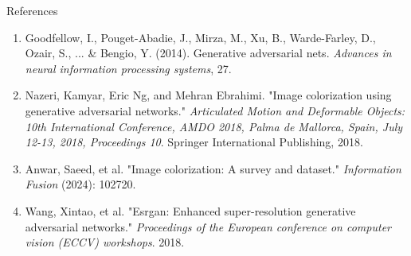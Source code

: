 \documentclass[aspectratio=169]{beamer}
\theoremstyle{definition}
\begin{document}
\begin{frame}{References}
    \begin{enumerate}
        \item Goodfellow, I., Pouget-Abadie, J., Mirza, M., Xu, B., Warde-Farley, D., Ozair, S., ... \& Bengio, Y. (2014). Generative adversarial nets. \emph{Advances in neural information processing systems}, 27.
        \item Nazeri, Kamyar, Eric Ng, and Mehran Ebrahimi. "Image colorization using generative adversarial networks." \emph{Articulated Motion and Deformable Objects: 10th International Conference, AMDO 2018, Palma de Mallorca, Spain, July 12-13, 2018, Proceedings 10}. Springer International Publishing, 2018.
        \item Anwar, Saeed, et al. "Image colorization: A survey and dataset." \emph{Information Fusion} (2024): 102720.
        \item Wang, Xintao, et al. "Esrgan: Enhanced super-resolution generative adversarial networks." \emph{Proceedings of the European conference on computer vision (ECCV) workshops}. 2018.
    \end{enumerate}
\end{frame}
\end{document}

